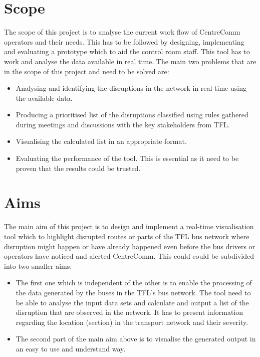 \section{Scope}
The scope of this project is to analyse the current work flow of CentreComm operators and their needs. This has to be followed by designing, implementing and evaluating a prototype which to aid the control room staff. This tool has to work and analyse the data available in real time. The main two problems that are in the scope of this project and need to be solved are:
\begin{itemize}
	\item Analysing and identifying the disruptions in the network in real-time using the available data.
	\item Producing a prioritised list of the disruptions classified using rules gathered during meetings and discussions with the key stakeholders from TFL.
	\item Visualising the calculated list in an appropriate format.
	\item Evaluating the performance of the tool. This is essential as it need to be proven that the results could be trusted.
\end{itemize} 
\section{Aims}
The main aim of this project is to design and implement a real-time visualisation tool which to highlight disrupted routes or parts of the TFL bus network where disruption might happen or have already happened even before the bus drivers or operators have noticed and alerted CentreComm. This could could be subdivided into two smaller aims:
\begin{itemize}
	\item The first one which is independent of the other is to enable the processing of the data generated by the buses in the TFL's bus network. The tool need to be able to analyse the input data sets and calculate and output a list of the disruption that are observed in the network. It has to present information regarding the location (section) in the transport network and their severity.
	\item The second part of the main aim above is to visualise the generated output in an easy to use and understand way.
\end{itemize}

